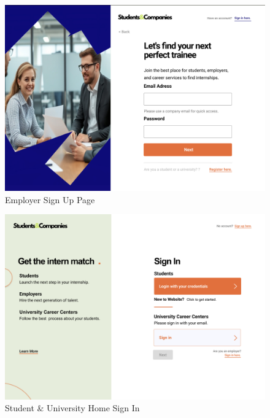 \documentclass[a4paper,12pt]{article}
\begin{document}
\begin{figure}[H]
    \centering
    \includegraphics[scale = 0.45]{figures/UserInterfaces/General/EmployerSignUp.png}
    \caption{Employer Sign Up Page}
    \centering
\end{figure}
\begin{figure}[H]
    \centering
    \includegraphics[scale = 0.42]{figures/UserInterfaces/General/HomeSignIn.png}
    \caption{Student \& University Home Sign In}
     \centering
\end{figure}
\end{document}

